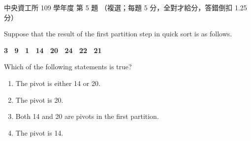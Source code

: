 \begin{pastexam}[label={px:ncu-109-dsa-05}]{中央資工所 109 學年度 第 5 題}
（複選；每題 5 分，全對才給分，答錯倒扣 1.25 分）

Suppose that the result of the first partition step in quick sort is as follows.
\begin{center}\textbf{3 \ 9 \ 1 \ 14 \ 20 \ 24 \ 22 \ 21}\end{center}
Which of the following statements is true?
\begin{enumerate}[label=(\Alph*)]
\item The pivot is either 14 or 20.
\item The pivot is 20.
\item Both 14 and 20 are pivots in the first partition.
\item The pivot is 14.
\end{enumerate}
\end{pastexam}

